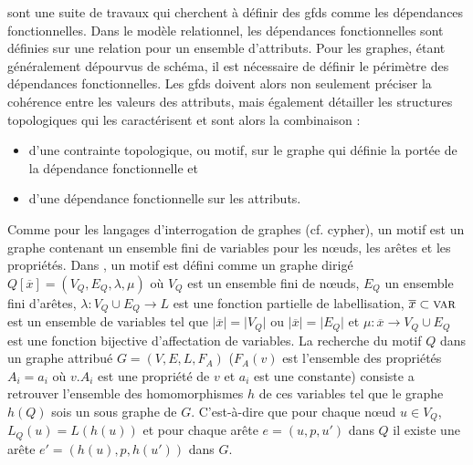 \cite{fanKeysGraphs2015,fanFunctionalDependenciesGraphs2016, fanDependenciesGraphs2019} sont une suite de travaux qui cherchent à définir des \glspl{gfd} comme les dépendances fonctionnelles.
Dans le modèle relationnel, les dépendances fonctionnelles sont définies sur une relation pour un ensemble d'attributs.
Pour les graphes, étant généralement dépourvus de schéma, il est nécessaire de définir le périmètre des dépendances fonctionnelles.
Les \glspl{gfd} doivent alors non seulement préciser la cohérence entre les valeurs des attributs, mais également détailler les structures topologiques qui les caractérisent et sont alors la combinaison :
\begin{itemize}
    \item d'une contrainte topologique, ou motif, sur le graphe qui définie la portée de la dépendance fonctionnelle et
    \item d'une dépendance fonctionnelle sur les attributs.
\end{itemize}

Comme pour les langages d'interrogation de graphes (cf. \gls{cypher}), un motif est un graphe contenant un ensemble fini de variables pour les nœuds, les arêtes et les propriétés.
Dans \cite{fanDependenciesGraphs2019}, un motif est défini comme un graphe dirigé $Q[\overline{x}] = (V_Q, E_Q, \lambda, \mu)$ où $V_Q$ est un ensemble fini de nœuds, $E_Q$ un ensemble fini d'arêtes, $\lambda : V_Q \cup E_Q \to L$ est une fonction partielle de labellisation, $\overline{x} \subset \textsc{var}$ est un ensemble de variables tel que $\lvert \overline{x} \rvert = \lvert V_Q \rvert$ ou $\lvert \overline{x} \rvert = \lvert E_Q \rvert$ et $\mu : \overline{x} \to V_Q \cup E_Q$ est une fonction bijective d'affectation de variables.
La recherche du motif $Q$ dans un graphe attribué $G = (V, E, L, F_A)$ ($F_A(v)$ est l'ensemble des propriétés $A_i = a_i$ où $v.A_i$ est une propriété de $v$ et $a_i$ est une constante) consiste a retrouver l'ensemble des homomorphismes $h$ de ces variables tel que le graphe $h(Q)$ sois un sous graphe de $G$.
C'est-à-dire que pour chaque nœud $u \in V_Q$, $L_Q(u) = L(h(u))$ et pour chaque arête $e = (u, p, u')$ dans $Q$ il existe une arête $e' = (h(u), p, h(u'))$ dans $G$.

